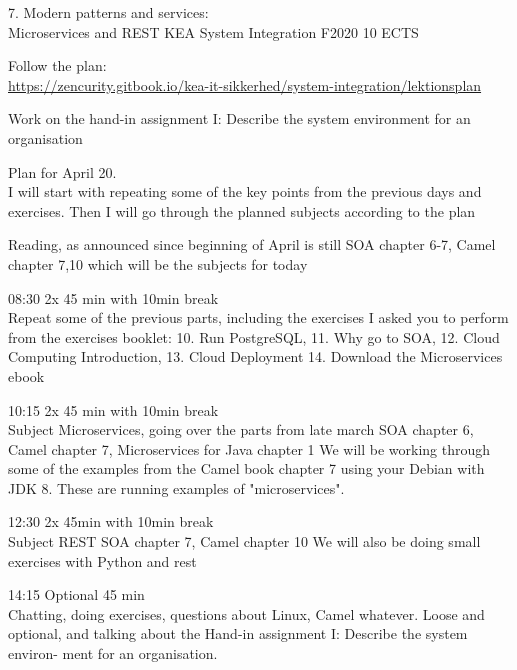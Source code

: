 \documentclass[Screen16to9,17pt]{foils}
\begin{document}
\mytitlepage
{7. Modern patterns and services:\\ Microservices and REST}
{KEA System Integration F2020 10 ECTS}


\begin{list2}
\item Follow the plan:\\
\url{https://zencurity.gitbook.io/kea-it-sikkerhed/system-integration/lektionsplan}
\item Work on the hand-in assignment I: Describe the system environment for an organisation
\item Plan for April 20.\\
I will start with repeating some of the key points from the previous days and exercises.
Then I will go through the planned subjects according to the plan
\item Reading, as announced since beginning of April is still
SOA chapter 6-7, Camel chapter 7,10 which will be the subjects for today
\end{list2}

\begin{list2}
\item 08:30 2x 45 min with 10min break\\
 Repeat some of the previous parts, including the exercises I asked you to perform from the exercises booklet:
10. Run PostgreSQL, 11. Why go to SOA, 12. Cloud Computing Introduction, 13. Cloud Deployment
14. Download the Microservices ebook

\item 10:15 2x 45 min with 10min break\\
 Subject Microservices, going over the parts from late march
SOA chapter 6, Camel chapter 7, Microservices for Java chapter 1
We will be working through some of the examples from the Camel book chapter 7 using your Debian with JDK 8. These are running examples of "microservices".

\item 12:30 2x 45min with 10min break \\
Subject REST
SOA chapter 7, Camel chapter 10
We will also be doing small exercises with Python and rest

\item 14:15 Optional 45 min\\
Chatting, doing exercises, questions about Linux, Camel whatever.
Loose and optional, and talking about the  Hand-in assignment I: Describe the system environ-
ment for an organisation.
\end{list2}
\end{document}
